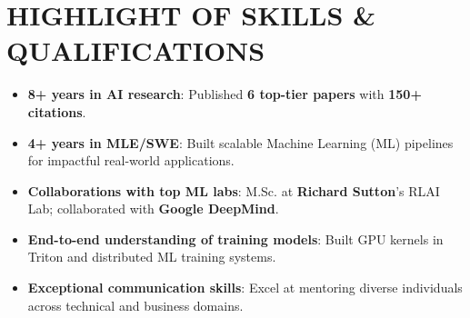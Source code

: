 \section{HIGHLIGHT OF SKILLS \& QUALIFICATIONS}
\begin{itemize}
    \item \textbf{8+ years in AI research}: Published \textbf{6 top-tier papers} with \textbf{150+ citations}.
    \item \textbf{4+ years in MLE/SWE}: Built scalable Machine Learning (ML) pipelines for impactful real-world applications.
    \item \textbf{Collaborations with top ML labs}: M.Sc. at \textbf{Richard Sutton}'s RLAI Lab; collaborated with \textbf{Google DeepMind}.
    \item \textbf{End-to-end understanding of training models}: Built GPU kernels in Triton and distributed ML training systems.
    \item \textbf{Exceptional communication skills}: Excel at mentoring diverse individuals across technical and business domains.
\end{itemize}